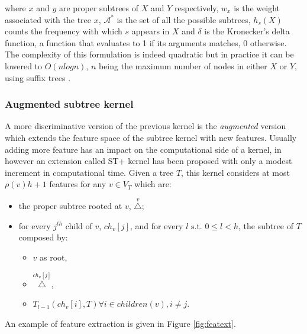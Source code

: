 where $x$ and $y$ are proper subtrees of $X$ and $Y$ respectively, $w_x$ is the 
weight associated with the tree $x$, $\mathcal{A}^*$ is the set of all the possible
subtrees, $h_s(X)$ counts the frequency with which $s$ appears in $X$ and
$\delta$ is the Kronecker's delta function, a function that evaluates to 1 if its
arguments matches, 0 otherwise.
The complexity of this formulation is indeed quadratic but in practice it can be
lowered to $O(nlogn)$, $n$ being the maximum number of nodes in either $X$ or $Y$,
using suffix trees \cite{viswanathan04fastkernels}.

\subsubsection{Augmented subtree kernel}
A more discriminative version of the previous kernel is the \emph{augmented} version
which extends the feature space of the subtree kernel with new features.
Usually adding more feature has an impact on the computational side of a kernel,
in \cite{dasanmartino2015exploiting} however an extension called ST+ kernel has been proposed with
only a modest increment in computational time.
Given a tree $T$, this kernel considers at most $\rho(v)h + 1$ features for any
$v \in V_T$ which are:
\begin{itemize}
    \item the proper subtree rooted at $v$, $\overset{v}{\triangle}$;
    \item for every $j^{th}$ child of $v$, $ch_v[j]$, and for every $l\text{ s.t. }0 \leq l < h$,
        the subtree of $T$ composed by:
        \begin{itemize}
            \item $v$ as root,
            \item $\overset{ch_v[j]}{\triangle}$,
            \item $T_{l-1}(ch_v[i],T) \forall i \in children(v), i \ne j$.
        \end{itemize}
\end{itemize}

An example of feature extraction is given in Figure \ref{fig:featext}.

